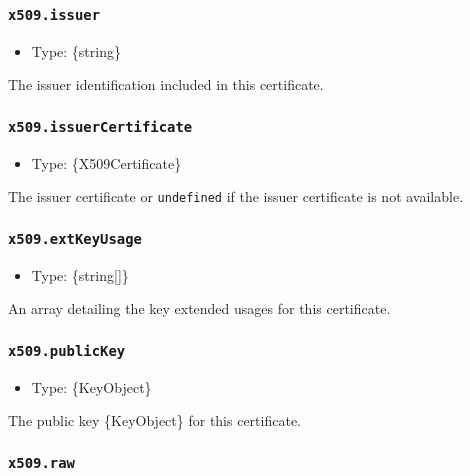 \subsubsection{\texorpdfstring{\texttt{x509.issuer}}{x509.issuer}}\label{x509.issuer}

\begin{itemize}
\tightlist
\item
  Type: \{string\}
\end{itemize}

The issuer identification included in this certificate.

\subsubsection{\texorpdfstring{\texttt{x509.issuerCertificate}}{x509.issuerCertificate}}\label{x509.issuercertificate}

\begin{itemize}
\tightlist
\item
  Type: \{X509Certificate\}
\end{itemize}

The issuer certificate or \texttt{undefined} if the issuer certificate
is not available.

\subsubsection{\texorpdfstring{\texttt{x509.extKeyUsage}}{x509.extKeyUsage}}\label{x509.extkeyusage}

\begin{itemize}
\tightlist
\item
  Type: \{string{[}{]}\}
\end{itemize}

An array detailing the key extended usages for this certificate.

\subsubsection{\texorpdfstring{\texttt{x509.publicKey}}{x509.publicKey}}\label{x509.publickey}

\begin{itemize}
\tightlist
\item
  Type: \{KeyObject\}
\end{itemize}

The public key \{KeyObject\} for this certificate.

\subsubsection{\texorpdfstring{\texttt{x509.raw}}{x509.raw}}\label{x509.raw}


